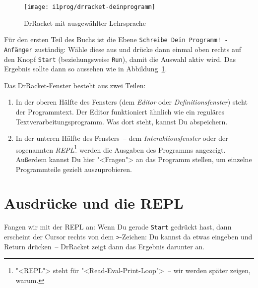 \begin{figure}[tb]
  \centering
  \texttt{[image: i1prog/drracket-deinprogramm]}
  \caption{DrRacket mit ausgewählter Lehrsprache}
  \label{fig:drracket-deinprogramm}
\end{figure}

Für den ersten Teil des Buchs ist die Ebene \texttt{Schreibe Dein
  Programm! - Anfänger} zuständig: Wähle
diese aus und drücke dann einmal oben rechts auf den Knopf
\texttt{Start} (beziehungsweise \texttt{Run}), damit die Auswahl aktiv wird.
Das Ergebnis sollte dann so aussehen wie in
Abbildung~\ref{fig:drracket-deinprogramm}.

Das DrRacket-Fenster besteht aus zwei Teilen:
%
\begin{enumerate}
\item In der oberen Hälfte des Fensters (dem
  \textit{Editor} oder
  \textit{Definitionsfenster}) steht der
  Programmtext.  Der Editor funktioniert ähnlich wie ein reguläres
  Textverarbeitungsprogramm.  Was dort steht, kannst Du abspeichern.
\item In der unteren Hälfte des Fensters~-- dem
  \textit{Interaktionsfenster} oder der
  sogenannten \textit{REPL}\footnote{"<REPL"> steht für
    "<Read-Eval-Print-Loop">~-- wir werden später zeigen, warum.}
  werden die Ausgaben des Programms angezeigt.  Außerdem kannst Du
  hier "<Fragen"> an das Programm stellen, um einzelne Programmteile
  gezielt auszuprobieren.
\end{enumerate}
%

\section{Ausdrücke und die REPL}

Fangen wir mit der REPL an: Wenn Du gerade \texttt{Start} gedrückt
hast, dann erscheint der Cursor rechts von dem \lstinline{>}-Zeichen: Du
kannst da etwas eingeben und Return drücken~-- DrRacket zeigt dann
das Ergebnis darunter an.

